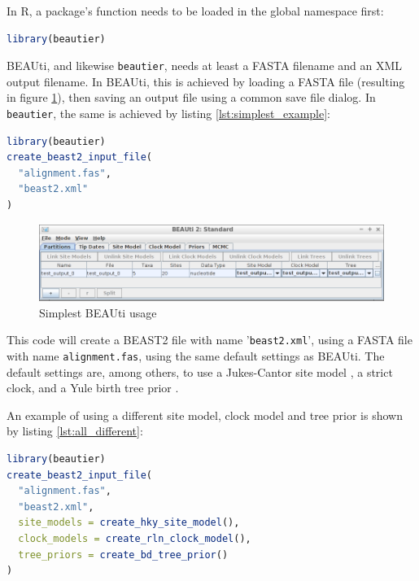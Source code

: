 \documentclass{article}
\begin{document}
In R, a package's function needs to be loaded in the global namespace first:

\begin{lstlisting}[language=R, caption=Loading, label=lst:loading_beautier, floatplacement=H]
library(beautier)
\end{lstlisting}

BEAUti, and likewise \verb;beautier;, needs at least a FASTA filename
and an XML output filename. In BEAUti, this is achieved by loading a FASTA file (resulting
in figure \ref{fig:simplest_beauti_usage}), then saving an output file using a common
save file dialog. In \verb;beautier;, the same is achieved by listing \ref{lst:simplest_example}:

\begin{lstlisting}[language=R, caption=Simplest example, label=lst:simplest_example, floatplacement=H]
library(beautier)
create_beast2_input_file(
  "alignment.fas",
  "beast2.xml"
)
\end{lstlisting}

\begin{figure}
  \centering
  \includegraphics[width=\textwidth]{all_default.png}
  \caption{Simplest BEAUti usage}
  \label{fig:simplest_beauti_usage}
\end{figure}

This code will create a BEAST2 file with name '\verb;beast2.xml;',
using a FASTA file with name \verb;alignment.fas;, using the same default settings as BEAUti.
The default settings are, among others, to use a Jukes-Cantor site model \cite{cantor1969mammalian}, 
a strict clock, and a Yule birth tree prior \cite{yule}. 

An example of using a different site model, clock model and tree prior is shown by listing \ref{lst:all_different}:

\begin{lstlisting}[language=R, caption=Example with different site model and clock model and tree prior, label=lst:all_different, floatplacement=H]
library(beautier)
create_beast2_input_file(
  "alignment.fas",
  "beast2.xml",
  site_models = create_hky_site_model(),
  clock_models = create_rln_clock_model(),
  tree_priors = create_bd_tree_prior()
)
\end{lstlisting}
\end{document}
